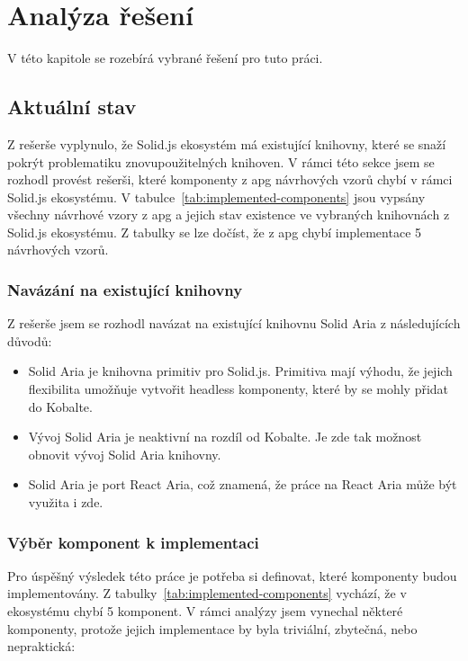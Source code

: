 \chapter{Analýza řešení}
\label{chap:analysis}

V této kapitole se rozebírá vybrané řešení pro tuto práci.

\section{Aktuální stav}

Z rešerše vyplynulo, že Solid.js ekosystém má existující knihovny, které se snaží pokrýt problematiku znovupoužitelných knihoven.
V rámci této sekce jsem se rozhodl provést rešerši, které komponenty z \gls{apg} návrhových vzorů chybí v rámci Solid.js ekosystému.
V tabulce~\ref{tab:implemented-components} jsou vypsány všechny návrhové vzory z \gls{apg} a jejich stav existence ve vybraných knihovnách z Solid.js ekosystému.
Z tabulky se lze dočíst, že z \gls{apg} chybí implementace 5 návrhových vzorů.

\subsection{Navázání na existující knihovny}

Z rešerše jsem se rozhodl navázat na existující knihovnu Solid Aria z následujících důvodů:

\begin{itemize}
    \item Solid Aria je knihovna primitiv pro Solid.js. Primitiva mají výhodu, že jejich flexibilita umožňuje vytvořit headless komponenty, které by se mohly přidat do Kobalte.
    \item Vývoj Solid Aria je neaktivní na rozdíl od Kobalte. Je zde tak možnost obnovit vývoj Solid Aria knihovny.
    \item Solid Aria je port React Aria, což znamená, že práce na React Aria může být využita i zde.
\end{itemize}

\subsection{Výběr komponent k implementaci}

Pro úspěšný výsledek této práce je potřeba si definovat, které komponenty budou implementovány.
Z tabulky~\ref{tab:implemented-components} vychází, že v ekosystému chybí 5 komponent.
V rámci analýzy jsem vynechal některé komponenty, protože jejich implementace by byla triviální, zbytečná, nebo nepraktická:

